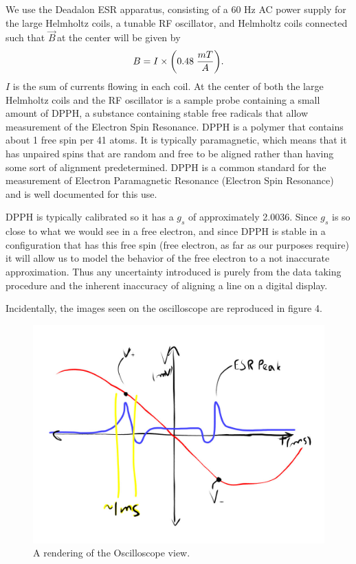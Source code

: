 \documentclass{article}
\newcommand{\B}{$\vec{B}\,$}
\begin{document}
	We use the Deadalon ESR apparatus, consisting of a 60 Hz AC power supply for the large Helmholtz coils, a tunable RF oscillator, and Helmholtz coils connected such that \B at the center will be given by
	\begin{equation*}
		B = I \times \bigg{(}0.48 \hspace{.1cm} \frac{mT}{A}\bigg{)}.
	\end{equation*}
	$I$ is the sum of currents flowing in each coil.  At the center of both the large Helmholtz coils and the RF oscillator is a sample probe containing a small amount of DPPH, a substance containing stable free radicals that allow measurement of the Electron Spin Resonance.  DPPH is a polymer that contains about 1 free spin per 41 atoms.  It is typically paramagnetic, which means that it has unpaired spins that are random and free to be aligned rather than having some sort of alignment predetermined.  DPPH is a common standard for the measurement of Electron Paramagnetic Resonance (Electron Spin Resonance) and is well documented for this use.

	\vspace{.25cm}

	DPPH is typically calibrated so it has a $g_s$ of approximately 2.0036. \cite{DPPH}  Since $g_s$ is so close to what we would see in a free electron, and since DPPH is stable in a configuration that has this free spin (free electron, as far as our purposes require) it will allow us to model the behavior of the free electron to a not inaccurate approximation.  Thus any uncertainty introduced is purely from the data taking procedure and the inherent inaccuracy of aligning a line on a digital display.

	\vspace{.25cm}

	Incidentally, the images seen on the oscilloscope are reproduced in figure 4.

	\begin{figure}[!htb]
		\centering
		\includegraphics[scale=.35]{esrpeaks.jpg}
		\caption{A rendering of the Oscilloscope view.}
	\end{figure}
\end{document}
